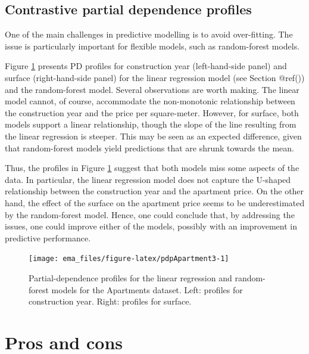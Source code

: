 \documentclass[]{krantz}
\begin{document}
\hypertarget{contrastive-partial-dependence-profiles}{%
\subsection{Contrastive partial dependence profiles}\label{contrastive-partial-dependence-profiles}}

One of the main challenges in predictive modelling is to avoid over-fitting. The issue is particularly important for flexible models, such as random-forest models.

Figure \ref{fig:pdpApartment3} presents PD profiles for construction year (left-hand-side panel) and surface (right-hand-side panel) for the linear regression model (see Section @ref()) and the random-forest model. Several observations are worth making. The linear model cannot, of course, accommodate the non-monotonic relationship between the construction year and the price per square-meter. However, for surface, both models support a linear relationship, though the slope of the line resulting from the linear regression is steeper. This may be seen as an expected difference, given that random-forest models yield predictions that are shrunk towards the mean.

Thus, the profiles in Figure \ref{fig:pdpApartment3} suggest that both models miss some aspects of the data. In particular, the linear regression model does not capture the U-shaped relationship between the construction year and the apartment price. On the other hand, the effect of the surface on the apartment price seems to be underestimated by the random-forest model. Hence, one could conclude that, by addressing the issues, one could improve either of the models, possibly with an improvement in predictive performance.

\begin{figure}

{\centering \texttt{[image: ema\_files/figure-latex/pdpApartment3-1]} 

}

\caption{Partial-dependence profiles for the linear regression and random-forest models for the Apartments dataset. Left: profiles for construction year. Right: profiles for surface.}\label{fig:pdpApartment3}
\end{figure}

\hypertarget{PDPProsCons}{%
\section{Pros and cons}\label{PDPProsCons}}
\end{document}
